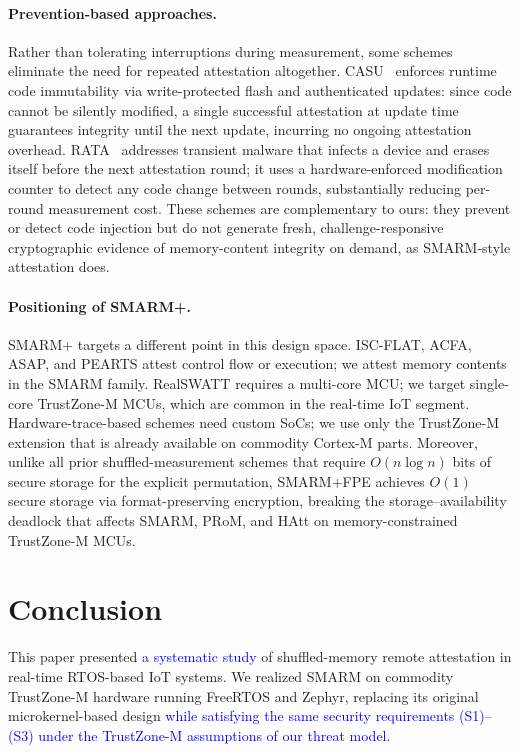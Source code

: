 \documentclass[journal]{IEEEtran}
\newcommand\ben[1]{\textcolor{blue}{#1}}
\newcommand{\rtsmarm}{SMARM+\xspace}
\newcommand{\rtsmarmtwo}{SMARM+FPE\xspace}
\begin{document}
{\paragraph{Prevention-based approaches.}
Rather than tolerating interruptions during measurement,
some schemes eliminate the need for repeated attestation
altogether. CASU~\cite{casu} enforces runtime code
immutability via write-protected flash and authenticated
updates: since code cannot be silently modified, a single
successful attestation at update time guarantees integrity
until the next update, incurring no ongoing attestation
overhead. RATA~\cite{rata} addresses transient malware
that infects a device and erases itself before the next
attestation round; it uses a hardware-enforced modification
counter to detect any code change between rounds, substantially
reducing per-round measurement cost. These schemes are
complementary to ours: they prevent or detect code injection
but do not generate fresh, challenge-responsive
cryptographic evidence of memory-content integrity on demand,
as SMARM-style attestation does.

\paragraph{Positioning of \rtsmarm.}
\rtsmarm targets a different point in this design space.
ISC-FLAT, ACFA, ASAP, and PEARTS attest control flow or
execution; we attest memory contents in the SMARM family.
RealSWATT requires a multi-core MCU; we target single-core
TrustZone-M MCUs, which are common in the real-time IoT
segment. Hardware-trace-based schemes need custom SoCs;
we use only the TrustZone-M extension that is already
available on commodity Cortex-M parts. Moreover, unlike all prior shuffled-measurement schemes that require $O(n \log n)$ bits of secure storage for the explicit permutation, \rtsmarmtwo achieves $O(1)$ secure
storage via format-preserving encryption, breaking the
storage--availability deadlock that affects SMARM, PRoM,
and HAtt on memory-constrained TrustZone-M MCUs.
}


\section{Conclusion}
\label{sec:conclusion}

This paper presented \ben{a systematic study} of shuffled-memory remote attestation in real-time RTOS-based IoT systems. We realized SMARM on commodity TrustZone-M hardware running FreeRTOS and Zephyr, replacing its original microkernel-based design \ben{while satisfying the same security requirements (S1)--(S3) under the TrustZone-M assumptions of our threat model}.
\end{document}
